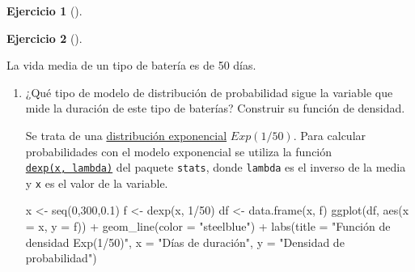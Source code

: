 \documentclass[
  a4paper,
]{scrreport}
\newenvironment{Shaded}{\begin{snugshade}}{\end{snugshade}}
\newcommand{\AttributeTok}[1]{\textcolor[rgb]{0.40,0.45,0.13}{#1}}
\newcommand{\DecValTok}[1]{\textcolor[rgb]{0.68,0.00,0.00}{#1}}
\newcommand{\FloatTok}[1]{\textcolor[rgb]{0.68,0.00,0.00}{#1}}
\newcommand{\FunctionTok}[1]{\textcolor[rgb]{0.28,0.35,0.67}{#1}}
\newcommand{\NormalTok}[1]{\textcolor[rgb]{0.00,0.23,0.31}{#1}}
\newcommand{\OtherTok}[1]{\textcolor[rgb]{0.00,0.23,0.31}{#1}}
\newcommand{\SpecialCharTok}[1]{\textcolor[rgb]{0.37,0.37,0.37}{#1}}
\newcommand{\StringTok}[1]{\textcolor[rgb]{0.13,0.47,0.30}{#1}}
\theoremstyle{definition}
\newtheorem{exercise}{Ejercicio}[chapter]
\theoremstyle{remark}
\begin{document}
\begin{exercise}[]
\begin{enumerate}
\begin{tcolorbox}
\begin{figure}[H]
{  }

  \end{figure}

  \end{tcolorbox}
\end{enumerate}

\end{exercise}

\begin{exercise}[]\protect\hypertarget{exr-distribuciones-probabilidad-5}{}\label{exr-distribuciones-probabilidad-5}

La vida media de un tipo de batería es de 50 días.

\begin{enumerate}
\def\labelenumi{\alph{enumi}.}
\item
  ¿Qué tipo de modelo de distribución de probabilidad sigue la variable
  que mide la duración de este tipo de baterías? Construir su función de
  densidad.

  \begin{tcolorbox}[enhanced jigsaw, coltitle=black, left=2mm, colback=white, leftrule=.75mm, toptitle=1mm, breakable, bottomrule=.15mm, titlerule=0mm, bottomtitle=1mm, title=\textcolor{quarto-callout-tip-color}{\faLightbulb}\hspace{0.5em}{Solución}, arc=.35mm, toprule=.15mm, rightrule=.15mm, colframe=quarto-callout-tip-color-frame, opacityback=0, colbacktitle=quarto-callout-tip-color!10!white, opacitybacktitle=0.6]

  Se trata de una
  \href{https://es.wikipedia.org/wiki/Distribuci\%C3\%B3n_exponencial}{distribución
  exponencial} \(Exp(1/50)\). Para calcular probabilidades con el modelo
  exponencial se utiliza la función
  \href{https://www.rdocumentation.org/packages/stats/versions/3.3/topics/Exponential}{\texttt{dexp(x,\ lambda)}}
  del paquete \texttt{stats}, donde \texttt{lambda} es el inverso de la
  media y \texttt{x} es el valor de la variable.

\begin{Shaded}
\begin{Highlighting}[]
\NormalTok{x }\OtherTok{\textless{}{-}} \FunctionTok{seq}\NormalTok{(}\DecValTok{0}\NormalTok{,}\DecValTok{300}\NormalTok{,}\FloatTok{0.1}\NormalTok{)}
\NormalTok{f }\OtherTok{\textless{}{-}} \FunctionTok{dexp}\NormalTok{(x, }\DecValTok{1}\SpecialCharTok{/}\DecValTok{50}\NormalTok{)}
\NormalTok{df }\OtherTok{\textless{}{-}} \FunctionTok{data.frame}\NormalTok{(x, f)}
\FunctionTok{ggplot}\NormalTok{(df, }\FunctionTok{aes}\NormalTok{(}\AttributeTok{x =}\NormalTok{ x, }\AttributeTok{y =}\NormalTok{ f)) }\SpecialCharTok{+}
    \FunctionTok{geom\_line}\NormalTok{(}\AttributeTok{color =} \StringTok{"steelblue"}\NormalTok{) }\SpecialCharTok{+}
    \FunctionTok{labs}\NormalTok{(}\AttributeTok{title =} \StringTok{"Función de densidad Exp(1/50)"}\NormalTok{, }\AttributeTok{x =} \StringTok{"Días de duración"}\NormalTok{, }\AttributeTok{y =} \StringTok{"Densidad de probabilidad"}\NormalTok{)}
\end{Highlighting}
\end{Shaded}


\end{tcolorbox}
\end{enumerate}
\end{exercise}
\end{document}
